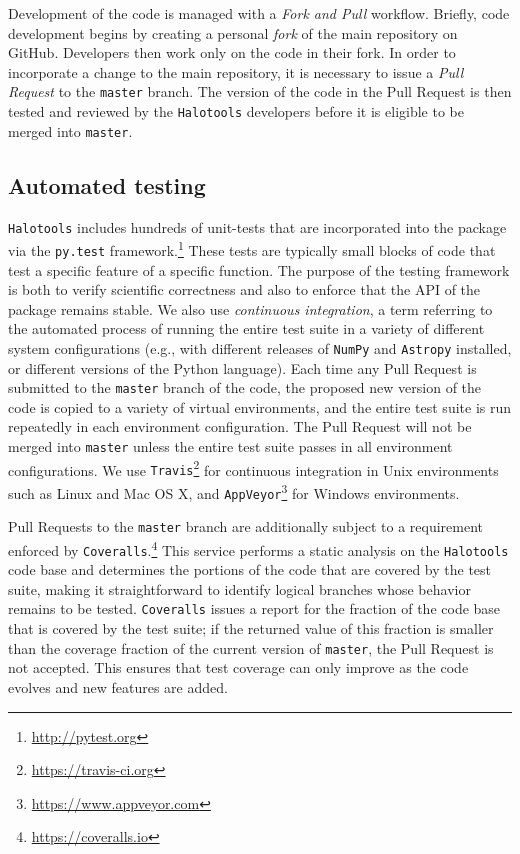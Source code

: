 \documentclass[twocolumn, tighten]{aastex6}
\begin{document}
Development of the code is managed with a {\em Fork and Pull} workflow. Briefly, code development begins by creating a personal {\em fork} of the main repository on GitHub. Developers then work only on the code in their fork. In order to incorporate a change to the main repository, it is necessary to issue a {\em Pull Request} to the {\tt master} branch. The version of the code in the Pull Request is then tested and reviewed by the {\tt Halotools} developers before it is eligible to be merged into {\tt master}.

\subsection{Automated testing}
\label{subsection:testing}

{\tt Halotools} includes hundreds of unit-tests that are incorporated into the package via the {\tt py.test} framework.\footnote{\url{http://pytest.org}} These tests are typically small blocks of code that test a specific feature of a specific function. The purpose of the testing framework is both to verify scientific correctness and also to enforce that the API of the package remains stable. We also use {\em continuous integration}, a term referring to the automated process of running the entire test suite in a variety of different system configurations (e.g., with different releases of {\tt NumPy} and {\tt Astropy} installed, or different versions of the Python language). Each time any Pull Request is submitted to the {\tt master} branch of the code, the proposed new version of the code is copied to a variety of virtual environments, and the entire test suite is run repeatedly in each environment configuration. The Pull Request will not be merged into {\tt master} unless the entire test suite passes in all environment configurations. We use {\tt Travis}\footnote{\url{https://travis-ci.org}} for continuous integration in Unix environments such as Linux and Mac OS X, and {\tt AppVeyor}\footnote{\url{https://www.appveyor.com}} for Windows environments.

Pull Requests to the {\tt master} branch are additionally subject to a requirement enforced by {\tt Coveralls}.\footnote{\url{https://coveralls.io}} This service performs a static analysis on the {\tt Halotools} code base and determines the portions of the code that are covered by the test suite, making it straightforward to identify logical branches whose behavior remains to be tested. {\tt Coveralls} issues a report for the fraction of the code base that is covered by the test suite; if the returned value of this fraction is smaller than the coverage fraction of the current version of {\tt master}, the Pull Request is not accepted. This ensures that test coverage can only improve as the code evolves and new features are added.
\end{document}
